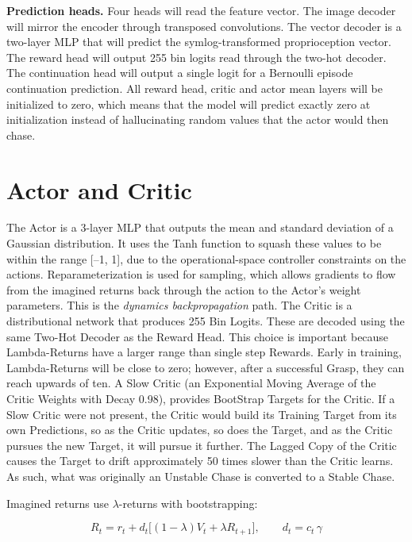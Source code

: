 \documentclass[12pt,a4paper,oneside]{report}
\begin{document}
\textbf{Prediction heads.} Four heads will read the feature vector. The image decoder will mirror the encoder through transposed convolutions. The vector decoder is a two-layer MLP that will predict the symlog-transformed proprioception vector. The reward head will output 255 bin logits read through the two-hot decoder. The continuation head will output a single logit for a Bernoulli episode continuation prediction. All reward head, critic and actor mean layers will be initialized to zero, which means that the model will predict exactly zero at initialization instead of hallucinating random values that the actor would then chase.

\hypertarget{actor-and-critic}{%
\section{Actor and Critic}\label{actor-and-critic}}

The Actor is a 3-layer MLP that outputs the mean and standard deviation of a Gaussian distribution. It uses the Tanh function to squash these values to be within the range {[}--1, 1{]}, due to the operational-space controller constraints on the actions. Reparameterization is used for sampling, which allows gradients to flow from the imagined returns back through the action to the Actor's weight parameters. This is the \emph{dynamics backpropagation} path. The Critic is a distributional network that produces 255 Bin Logits. These are decoded using the same Two-Hot Decoder as the Reward Head. This choice is important because Lambda-Returns have a larger range than single step Rewards. Early in training, Lambda-Returns will be close to zero; however, after a successful Grasp, they can reach upwards of ten. A Slow Critic (an Exponential Moving Average of the Critic Weights with Decay 0.98), provides BootStrap Targets for the Critic. If a Slow Critic were not present, the Critic would build its Training Target from its own Predictions, so as the Critic updates, so does the Target, and as the Critic pursues the new Target, it will pursue it further. The Lagged Copy of the Critic causes the Target to drift approximately 50 times slower than the Critic learns. As such, what was originally an Unstable Chase is converted to a Stable Chase.


Imagined returns use $\lambda$-returns with bootstrapping:

\begin{equation*}
R_t = r_t + d_t\bigl[(1-\lambda)V_t + \lambda R_{t+1}\bigr], \qquad d_t = c_t\,\gamma
\end{equation*}
\end{document}
